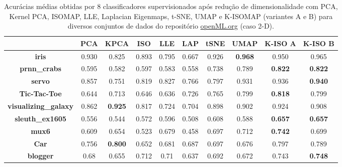 \documentclass[a4paper,12pt]{article}
\begin{document}
\begin{table*}[htb]
\scriptsize
  \centering
  \caption{Acurácias médias obtidas por 8 classificadores supervisionados após redução de dimensionalidade com PCA, Kernel PCA, ISOMAP, LLE, Laplacian Eigenmaps, t-SNE, UMAP e K-ISOMAP (variantes A e B) para diversos conjuntos de dados do repositório \url{openML.org}  (caso 2-D).}
  \begin{tabular}{cccccccccc}
    \toprule
  & \textbf{PCA} & \textbf{KPCA} & \textbf{ISO} & \textbf{LLE}   & \textbf{LAP} & \textbf{tSNE} & \textbf{UMAP} & \textbf{K-ISO A} & \textbf{K-ISO B}   \\
\midrule
\textbf{iris}             & 0.930        & 0.825          & 0.893        & 0.795        & 0.667              & 0.926          & \textbf{0.968} & 0.950            & 0.965          \\
\textbf{prnn\_crabs}      & 0.595        & 0.582          & 0.597        & 0.583        & 0.558              & 0.738          & 0.789          & \textbf{0.822}   & \textbf{0.822} \\
\textbf{servo}            & 0.857        & 0.751          & 0.819        & 0.827        & 0.766              & 0.797          & 0.931          & 0.936            & \textbf{0.940} \\
\textbf{Tic-Tac-Toe}      & 0.644        & 0.713          & 0.646        & 0.636        & 0.726              & 0.765          & 0.799          & \textbf{0.818}   & 0.799          \\
\textbf{visualizing\_galaxy}           & 0.862        & \textbf{0.925} & 0.817        & 0.724        & 0.704              & 0.898          & 0.902          & 0.924            & 0.908          \\
\textbf{sleuth\_ex1605}           & 0.556        & 0.544          & 0.572        & 0.596        & 0.508              & 0.608          & 0.588          & \textbf{0.657}   & \textbf{0.657} \\
\textbf{mux6}             & 0.609        & 0.654          & 0.523        & 0.679        & 0.458              & 0.697          & 0.712          & \textbf{0.742}   & 0.699          \\
\textbf{Car}   & 0.756        & \textbf{0.800} & 0.652        & 0.681        & 0.687              & 0.697          & 0.676          & 0.797            & 0.789          \\
\textbf{blogger}          & 0.68         & 0.655          & 0.712        & 0.71         & 0.637              & 0.692          & 0.672          & 0.743            & \textbf{0.748} \\

\end{tabular}
\end{table*}
\end{document}
